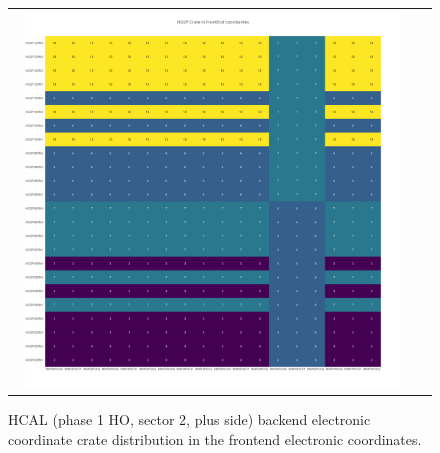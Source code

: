 \begin{figure}[htb]
 \begin{center}
  \begin{tabular}{cc}
   \includegraphics[angle=0,width=0.95\textwidth]{figures/appendix/HO2P_Crate_in_FrontEnd.png}
  \end{tabular}
  \caption{HCAL (phase 1 HO, sector 2, plus side) backend electronic coordinate crate distribution in the frontend electronic coordinates.}
  \label{fig:lmapHO2PCrateFEC}
 \end{center}
\end{figure}
\clearpage

